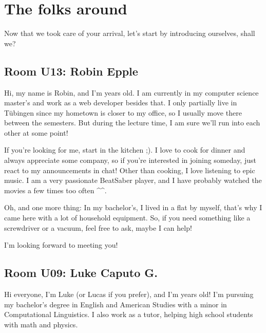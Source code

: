 \chapter{The folks around} \label{chap:introductions}
%
%
%

Now that we took care of your arrival, let's start by introducing ourselves, shall we?

\section{Room U13: Robin Epple} \label{sec:robinE}
%
\FPsub\result{\theCurrentDate}{\theBirthdate}
\FPdiv{}
\FPtrunc{}

Hi, my name is Robin, and I'm \myage{} years old. I am currently in my computer science master's and work as a web developer besides that. I only partially live in Tübingen since my hometown is closer to my office, so I usually move there between the semesters. But during the lecture time, I am sure we'll run into each other at some point!

If you're looking for me, start in the kitchen ;). I love to cook for dinner and always appreciate some company, so if you're interested in joining someday, just react to my announcements in chat! Other than cooking, I love listening to epic music. I am a very passionate BeatSaber player, and I have probably watched the  movies a few times too often \^{}\^{}.

Oh, and one more thing: In my bachelor's, I lived in a flat by myself, that's why I came here with a lot of household equipment. So, if you need something like a screwdriver or a vacuum, feel free to ask, maybe I can help!

I'm looking forward to meeting you!

\section{Room U09: Luke Caputo G.} \label{sec:lucasC}
%
\FPsub\result{\theCurrentDate}{\theBirthdate}
\FPdiv{}
\FPtrunc{}

Hi everyone, I’m Luke (or Lucas if you prefer), and I’m \myage{} years old! I’m pursuing my bachelor’s degree in English and American Studies with a minor in Computational Linguistics. I also work as a tutor, helping high school students with math and physics.  


